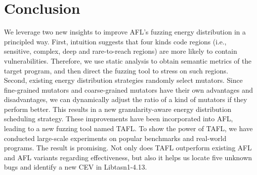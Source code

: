 \section{Conclusion}\label{conclusion}





We leverage two new insights to improve AFL's fuzzing energy distribution in a
principled way. First, intuition suggests that four kinds code regions (i.e.,
sensitive, complex, deep and rare-to-reach regions) are more likely to contain
vulnerabilities. Therefore, we use static analysis to obtain semantic metrics
of the target program, and then direct the fuzzing tool to stress on such
regions. Second, existing energy distribution strategies randomly select mutators.
Since fine-grained mutators and coarse-grained mutators have their own advantages and
disadvantages, we can dynamically adjust the ratio of a kind of mutators if they perform better.
This results in a new granularity-aware energy distribution scheduling strategy.
These improvements have been incorporated into AFL, leading to a new fuzzing
tool named TAFL.  To show the power of TAFL, we have conducted large-scale
experiments on popular benchmarks and real-world programs. The
result is promising. Not only does TAFL outperform existing AFL and AFL
variants regarding effectiveness, but also it helps us locate five unknown
bugs and identify a new CEV in Libtasn1-4.13.
